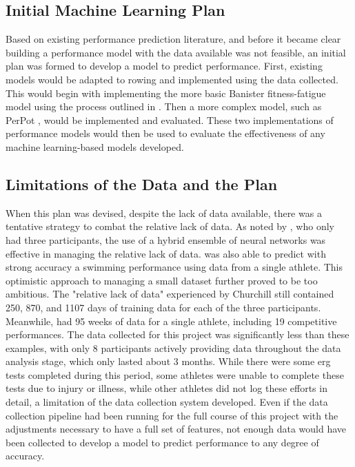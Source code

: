 \subsection{Initial Machine Learning Plan}
Based on existing performance prediction literature, and before it became clear building a performance model with the data available was not feasible, an initial plan was formed to develop a model to predict performance. First, existing models would be adapted to rowing and implemented using the data collected. This would begin with implementing the more basic Banister fitness-fatigue model using the process outlined in \textcite{Morton1990}. Then a more complex model, such as PerPot \cite{perl2001}, would be implemented and evaluated. These two implementations of performance models would then be used to evaluate the effectiveness of any machine learning-based models developed.

\subsection{Limitations of the Data and the Plan}
When this plan was devised, despite the lack of data available, there was a tentative strategy to combat the relative lack of data. As noted by \textcite{Churchill2014}, who only had three participants, the use of a hybrid ensemble of neural networks was effective in managing the relative lack of data. \textcite{Edelmannnusser2002} was also able to predict with strong accuracy a swimming performance using data from a single athlete. This optimistic approach to managing a small dataset further proved to be too ambitious. The "relative lack of data" experienced by Churchill still contained 250, 870, and 1107 days of training data for each of the three participants. Meanwhile, \textcite{Edelmannnusser2002} had 95 weeks of data for a single athlete, including 19 competitive performances. The data collected for this project was significantly less than these examples, with only 8 participants actively providing data throughout the data analysis stage, which only lasted about 3 months. While there were some erg tests completed during this period, some athletes were unable to complete these tests due to injury or illness, while other athletes did not log these efforts in detail, a limitation of the data collection system developed. Even if the data collection pipeline had been running for the full course of this project with the adjustments necessary to have a full set of features, not enough data would have been collected to develop a model to predict performance to any degree of accuracy.

